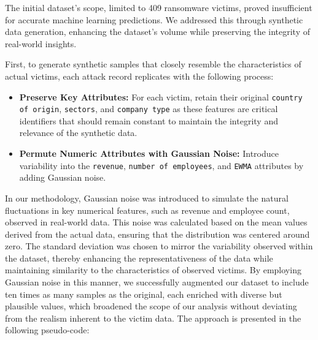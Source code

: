 \documentclass[running heads]{llncs}
\begin{document}
The initial dataset's scope, limited to 409 ransomware victims, proved insufficient for accurate machine learning predictions. We addressed this through synthetic data generation, enhancing the dataset's volume while preserving the integrity of real-world insights.

First, to generate synthetic samples that closely resemble the characteristics of actual victims, each attack record replicates with the following process:
\begin{itemize}
    \item \textbf{Preserve Key Attributes:} For each victim, retain their original \texttt{country of origin}, \texttt{sectors}, and \texttt{company type} as these features are critical identifiers that should remain constant to maintain the integrity and relevance of the synthetic data.
    \item \textbf{Permute Numeric Attributes with Gaussian Noise:} Introduce variability into the \texttt{revenue}, \texttt{number of employees}, and \texttt{EWMA} attributes by adding Gaussian noise.
\end{itemize}

In our methodology, Gaussian noise was introduced to simulate the natural fluctuations in key numerical features, such as revenue and employee count, observed in real-world data. This noise was calculated based on the mean values derived from the actual data, ensuring that the distribution was centered around zero. The standard deviation was chosen to mirror the variability observed within the dataset, thereby enhancing the representativeness of the data while maintaining similarity to the characteristics of observed victims. By employing Gaussian noise in this manner, we successfully augmented our dataset to include ten times as many samples as the original, each enriched with diverse but plausible values, which broadened the scope of our analysis without deviating from the realism inherent to the victim data. The approach is presented in the following pseudo-code:
\end{document}
